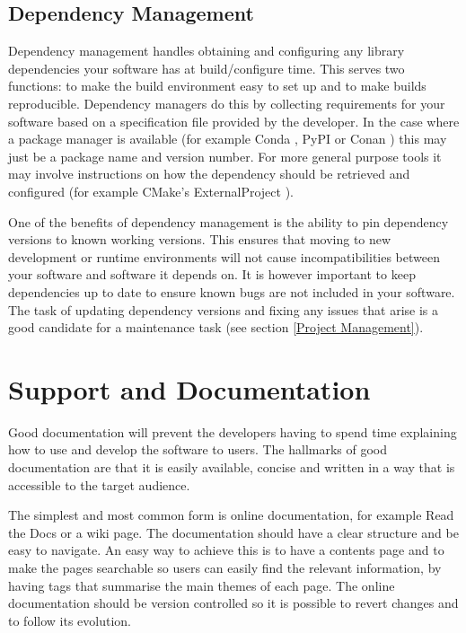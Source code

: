 \documentclass[jnr]{iosart2x}
\begin{document}
\subsection{Dependency Management}
\label{Dependency Management}

Dependency management handles obtaining and configuring any library dependencies your software has at build/configure time.
This serves two functions: to make the build environment easy to set up and to make builds reproducible.
Dependency managers do this by collecting requirements for your software based on a specification file provided by the developer.
In the case where a package manager is available (for example Conda \cite{Conda}, PyPI \cite{PyPI} or Conan \cite{Conan}) this may just be a package name and version number.
For more general purpose tools it may involve instructions on how the dependency should be retrieved and configured (for example CMake's ExternalProject \cite{CMake_ExternalProject}).

One of the benefits of dependency management is the ability to pin dependency versions to known working versions.
This ensures that moving to new development or runtime environments will not cause incompatibilities between your software and software it depends on.
It is however important to keep dependencies up to date to ensure known bugs are not included in your software.
The task of updating dependency versions and fixing any issues that arise is a good candidate for a maintenance task (see section \ref{Project Management}).

\section{Support and Documentation}
\label{Support and Documentation}

Good documentation will prevent the developers having to spend time explaining how to use and develop the software to users.
The hallmarks of good documentation are that it is easily available, concise and written in a way that is accessible to the target audience.

The simplest and most common form is online documentation, for example Read the Docs \cite{Read_The_Docs} or a wiki page.
The documentation should have a clear structure and be easy to navigate.
An easy way to achieve this is to have a contents page and to make the pages searchable so users can easily find the relevant information, by having tags that summarise the main themes of each page.
The online documentation should be version controlled so it is possible to revert changes and to follow its evolution.
\end{document}
